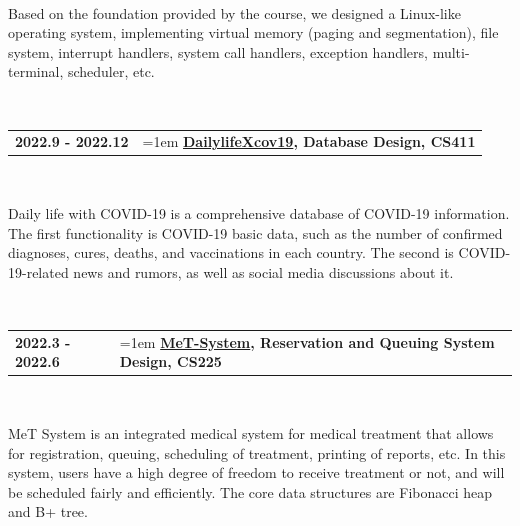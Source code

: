 \documentclass[11pt,english]{article}
\begin{document}
~\

\qquad Based on the foundation provided by the course, we designed a Linux-like operating system, implementing virtual memory (paging and segmentation), file system, interrupt handlers, system call handlers, exception handlers, multi-terminal, scheduler, etc.

~\

\begin{tabular}{p{1.5in}>{\hangindent=1em}p{5.05in}<{\raggedright}}
\textbf{2022.9 - 2022.12} & \textbf{\href{https://github.com/Erikaqvq/DailylifeXcov19}{DailylifeXcov19}, Database Design, CS411} \\
\end{tabular}

~\

\qquad Daily life with COVID-19 is a comprehensive database of COVID-19 information. The first functionality is COVID-19 basic data, such as the number of confirmed diagnoses, cures, deaths, and vaccinations in each country. The second is COVID-19-related news and rumors, as well as social media discussions about it.

~\

\begin{tabular}{p{1.5in}>{\hangindent=1em}p{5.05in}<{\raggedright}}
\textbf{2022.3 - 2022.6} & \textbf{\href{https://github.com/Erikaqvq/MeT-System}{MeT-System}, Reservation and Queuing System Design, CS225} \\
\end{tabular}

~\

\qquad MeT System is an integrated medical system for medical treatment that allows for registration, queuing, scheduling of treatment, printing of reports, etc. In this system, users have a high degree of freedom to receive treatment or not, and will be scheduled fairly and efficiently. The core data structures are Fibonacci heap and B+ tree.
\end{document}
